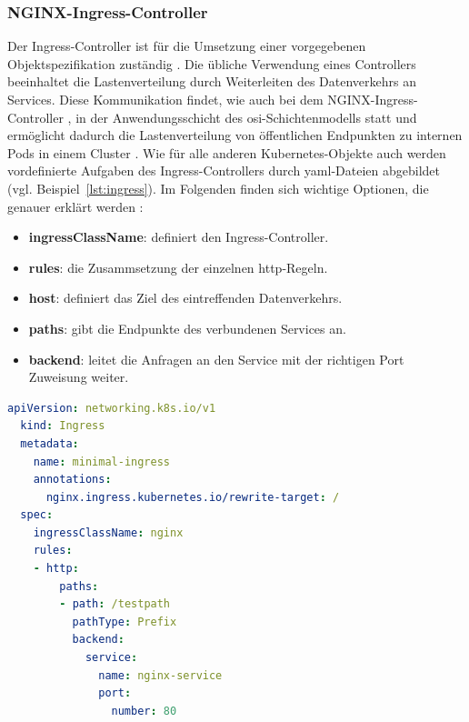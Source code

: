 \subsubsection{NGINX-Ingress-Controller}
Der Ingress-Controller ist für die Umsetzung einer vorgegebenen Objektspezifikation zuständig \cite{kubernetesingress}.
Die übliche Verwendung eines Controllers beeinhaltet die Lastenverteilung durch Weiterleiten des Datenverkehrs an Services. 
Diese Kommunikation findet, wie auch bei dem NGINX-Ingress-Controller \cite{kubernetesingresscontrollerlayer}, in der Anwendungsschicht des \acs{osi}-Schichtenmodells statt und ermöglicht dadurch die 
Lastenverteilung von öffentlichen Endpunkten zu internen Pods in einem Cluster \cite{kubernetesingressibm}.
Wie für alle anderen Kubernetes-Objekte auch werden vordefinierte Aufgaben des Ingress-Controllers durch \acs{yaml}-Dateien abgebildet (vgl. Beispiel~\ref{lst:ingress}).
Im Folgenden finden sich wichtige Optionen, die genauer erklärt werden \cite{kubernetesingress}:

\begin{itemize}
  \item \textbf{ingressClassName}: definiert den Ingress-Controller.
  \item \textbf{rules}: die Zusammsetzung der einzelnen \acs{http}-Regeln.
  \item \textbf{host}: definiert das Ziel des eintreffenden Datenverkehrs.
  \item \textbf{paths}: gibt die Endpunkte des verbundenen Services an.
  \item \textbf{backend}: leitet die Anfragen an den Service mit der richtigen Port Zuweisung weiter.
\end{itemize}

\begin{lstlisting}[caption={ingress.yaml \cite{kubernetesingress} },captionpos=b,label={lst:ingress},language=yaml]
  apiVersion: networking.k8s.io/v1
  kind: Ingress
  metadata:
    name: minimal-ingress
    annotations:
      nginx.ingress.kubernetes.io/rewrite-target: /
  spec:
    ingressClassName: nginx
    rules:
    - http:
        paths:
        - path: /testpath
          pathType: Prefix
          backend:
            service:
              name: nginx-service
              port:
                number: 80
  \end{lstlisting}
